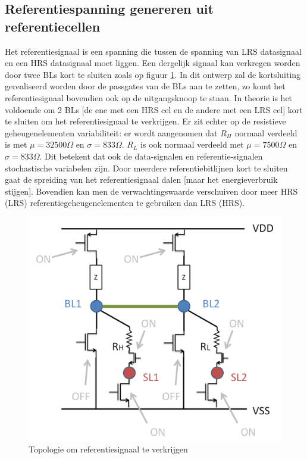 \subsection{Referentiespanning genereren uit referentiecellen}
\label{refread}
Het referentiesignaal is een spanning die tussen de spanning van LRS datasignaal en een HRS datasignaal moet liggen. Een dergelijk signaal kan verkregen worden door twee BLs kort te sluiten zoals op figuur \ref{fig:2cellref}. In dit ontwerp zal de kortsluiting gerealiseerd worden door de passgates van de BLs aan te zetten, zo komt het referentiesignaal bovendien ook op de uitgangsknoop te staan. In theorie is het voldoende om 2 BLs [de ene met een HRS cel en de andere met een LRS cel] kort te sluiten om het referentiesignaal te verkrijgen. Er zit echter op de resistieve geheugenelementen variabiliteit: er wordt aangenomen dat $R_{H}$ normaal verdeeld is met $\mu = 32500\Omega$ en $\sigma = 833\Omega$. $R_{L}$ is ook normaal verdeeld met $\mu = 7500\Omega$ en $\sigma = 833\Omega$. Dit betekent dat ook de data-signalen en referentie-signalen stochastische variabelen zijn.
Door meerdere referentiebitlijnen kort te sluiten gaat de spreiding van het referentiesignaal dalen [maar het energieverbruik stijgen]. Bovendien kan men de verwachtingswaarde verschuiven door meer HRS (LRS) referentiegeheugenelementen te gebruiken dan LRS (HRS).

\begin{figure}
  \centering
  \includegraphics[scale=0.3]{../fig/hfdstk-architecture-ref2cell.png}
  \caption[Referentiesignaal uitlezen]{Topologie om referentiesignaal te verkrijgen}
  \label{fig:2cellref}
\end{figure}

